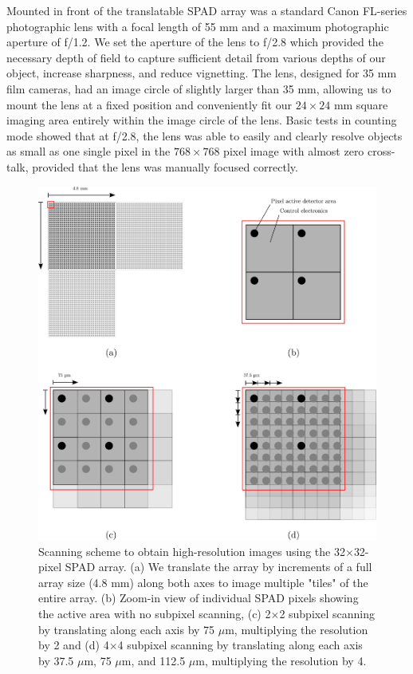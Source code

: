Mounted in front of the translatable SPAD array was a standard Canon FL-series photographic lens with a focal length of 55 mm and a maximum photographic aperture of f/1.2. We set the aperture of the lens to f/2.8 which provided the necessary depth of field to capture sufficient detail from various depths of our object, increase sharpness, and reduce vignetting. The lens, designed for 35 mm film cameras, had an image circle of slightly larger than 35 mm, allowing us to mount the lens at a fixed position and conveniently fit our $24\times24$ mm square imaging area entirely within the image circle of the lens. Basic tests in counting mode showed that at f/2.8, the lens was able to easily and clearly resolve objects as small as one single pixel in the $768\times768$ pixel image with almost zero cross-talk, provided that the lens was manually focused correctly.

\begin{figure}[h!]
\centerline{\includegraphics[width=15cm]{figure-first-spad-scanning.pdf}}
\caption{Scanning scheme to obtain high-resolution images using the 32$\times$32-pixel SPAD array. (a) We translate the array by increments of a full array size (4.8 mm) along both axes to image multiple "tiles" of the entire array. (b) Zoom-in view of individual SPAD pixels showing the active area with no subpixel scanning, (c) 2$\times$2 subpixel scanning by translating along each axis by 75 $\mu$m, multiplying the resolution by 2 and (d) 4$\times$4 subpixel scanning by translating along each axis by 37.5 $\mu$m, 75 $\mu$m, and 112.5 $\mu$m, multiplying the resolution by 4.}
\label{figure:first-spad-scanning}
\end{figure}


